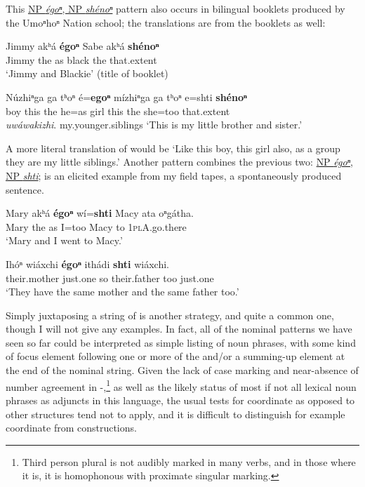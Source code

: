 \documentclass[output=paper]{LSP/langsci}
\begin{document}
This \underline{NP \textit{égoⁿ}, NP \textit{shénoⁿ}} pattern also occurs in bilingual booklets produced by the Umoⁿhoⁿ Nation school; the translations are from the booklets as well:
	
\begin{exe}	
\ex\label{ex:rudin:25}
\gll Jimmy 	akʰá \textbf{égoⁿ} Sabe akʰá \textbf{shénoⁿ} \\
Jimmy the  	as 	black 	the  	that.extent \\
\trans `Jimmy and Blackie' (title of booklet)

\ex\label{ex:rudin:26} 
\gll Núzhiⁿga ga tʰoⁿ é=\textbf{egoⁿ} mízhiⁿga ga  tʰoⁿ e=shti 	\textbf{shénoⁿ}  \\
boy 	this 	the 	he=as   	girl   this the she=too  that.extent 	 \\

\textit{uwáwakizhi}.
my.younger.siblings
\trans `This is my little brother and sister.' 	
\end{exe}	 
	
A more literal translation of  would be `Like this boy, this girl also, as a group they are my little siblings.' Another pattern combines the previous two:   \underline{NP \textit{égoⁿ}, NP \textit{shti}};  is an elicited example from my field tapes,  a spontaneously produced sentence. 

\begin{exe}	
\ex\label{ex:rudin:27}
\gll Mary akʰá \textbf{égoⁿ}  wí=\textbf{shti} Macy 	ata 	oⁿgátha. \\
Mary the as I=too Macy to 	\textsc{1plA}.go.there \\
\trans`Mary and  I went to Macy.'

\ex\label{ex:rudin:28}
\gll Ihóⁿ  wiáxchi  \textbf{égoⁿ} ithádi  \textbf{shti} wiáxchi. \\
their.mother  just.one so their.father too just.one \\
\trans `They have the same mother and the same father too.'
\end{exe}	

Simply juxtaposing a string of  is another  strategy, and quite a common one, though I will not give any examples. In fact, all of the nominal  patterns we have seen so far could be interpreted as simple listing of noun phrases, with some kind of focus element following one or more of the  and/or a summing-up element at the end of the nominal string. Given the lack of case marking and near-absence of number agreement  in -,\footnote{Third person plural is not audibly marked in many verbs, and in those where it is, it is homophonous with
proximate singular marking.} as well as the likely status of most if not all lexical noun phrases as adjuncts in this language, the usual tests for coordinate as opposed to other structures tend not to apply, and it is difficult to distinguish for example coordinate from  constructions.
\end{document}

